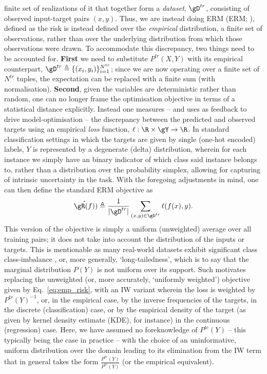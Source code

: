 finite set of realizations of it that together form a \emph{dataset}, \( \gD^{tr} \), consisting of
observed input-target pairs \( (x, y) \). 
%
Thus, we are instead doing \acf{ERM} (\acs{ERM}; \cite{vapnik1991principles}), defined as the risk
is instead defined over the \emph{empirical} distribution, a finite set of observations, rather
than over the underlying distribution from which those observations were drawn.
To accommodate this discrepancy, two things need to be accounted for. 
%
\textbf{First} we need to  substitute \( P^{tr}(X, Y) \) with its empirical counterpart, \( \gD^{tr}
\triangleq \{(x_i, y_i) \}_{i=1}^{N^{tr}} \); since we are now operating over a finite set of \(
N^{tr} \) tuples, the expectation can be replaced with a finite sum (with normalisation). 
%
\textbf{Second}, given the variables are deterministic rather than random, one can no longer frame the
optimisation objective in terms of a statistical distance explicitly. 
%
Instead one measures -- and uses as feedback to drive model-optimisation -- the discrepancy between
the predicted and observed targets using an empirical \emph{loss} function, \( \ell: \R \times \gY
\to \R \). 
%
In standard classification settings in which the targets are given by single (one-hot encoded)
labels, \( Y \) is represented by a degenerate (delta) distribution, wherein for each instance we
simply have an binary indicator of which class said instance belongs to, rather than a distribution
over the probability simplex, allowing for capturing of intrinsic uncertainty in the task.
%
With the foregoing adjustments in mind, one can then define the standard \ac{ERM} objective as
\begin{equation*}\label{eq:emp_risk} \hat{\gR(f)}) \triangleq \frac{1}{|\gD^{tr}|}  \sum_{(x, y)
\in \gD^{tr}} \ell (f(x), y). \end{equation*}
%
This version of the objective is simply a uniform (unweighted) average over all training pairs; it
does not take into account the distribution of the inputs or targets.
%
This is mentionable as many real-world datasets exhibit significant class class-imbalance
\citep{zhu2014capturing, van2017devil}, or, more generally, `long-tailedness', which is to say that
the marginal distribution \( P(Y) \) is not uniform over its support.
Such motivates replacing the unweighted (or, more accurately, `uniformly weighted') objective given
by Eq.~\ref{eq:emp_risk}, with an \ac{IW} variant wherein the loss is weighted
by \( P^{tr}(Y)^{-1} \), or, in the empirical case, by the inverse frequencies of the targets, in
the discrete (classification) case, or by the empirical density of the target (as given by kernel
density estimate (KDE), for instance) in the continuous (regression) case.
Here, we have assumed no foreknowledge of \( P^{te}(Y) \) -- this typically being the case in
practice -- with the choice of an uninformative, uniform distribution over the domain leading to
its elimination from the \ac{IW} term that in general takes the form \( \frac{ P^{te}(Y) }{
P^{tr}(Y) } \) (or the empirical equivalent).

